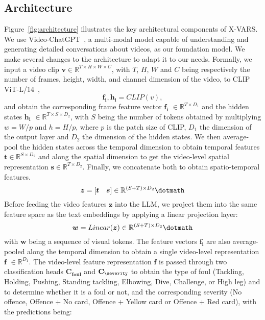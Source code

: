 \subsection{Architecture}

Figure~\ref{fig:architecture} illustrates the key architectural components of X-VARS. We use Video-ChatGPT~\cite{Maaz2023VideoChatGPT-arxiv}, a multi-modal model capable of understanding and generating detailed conversations about videos, as our foundation model. We make several changes to the architecture to adapt it to our needs.
Formally, we input a video clip $\mathbf{v} \in \mathbb{R}^{T\times H \times W \times C}$, with $T$, $H$, $W$ and $C$ being respectively the number of frames, height, width, and channel dimension of the video, to CLIP ViT-L/14~\cite{Radford2021Learning},
\begin{equation}
    \boldsymbol{f_i} , \boldsymbol{h_i} = CLIP(v) \comma
\end{equation}
and obtain the corresponding frame feature vector $\boldsymbol{f_i}$ $\in \mathbb{R}^{T\times D_1}$ and the hidden states $\boldsymbol{h_i}$ $\in \mathbb{R}^{T \times S \times D_2}$, with $S$ being the number of tokens obtained by multiplying $w = W/p$ and $h = H/p$, where $p$ is the patch size of CLIP, $D_1$ the dimension of the output layer and $D_2$ the dimension of the hidden states.
We then average-pool the hidden states across the temporal dimension to obtain temporal features $\textbf{t}\in \mathbb{R}^{S\times D_2}$ and along the spatial dimension to get the video-level spatial representation $\textbf{s}\in \mathbb{R}^{T\times D_2}$.
Finally, we concatenate both to obtain spatio-temporal features.
\begin{equation}
    \boldsymbol{z} = [\boldsymbol{t} \quad \boldsymbol{s}] \in \mathbb{R}^{(S + T) \times D_2} \dotmath
\end{equation}
Before feeding the video features $\boldsymbol{z}$ into the LLM, we project them into the same feature space as the text embeddings by applying a linear projection layer: 
\begin{equation}
    \boldsymbol{w} = Linear(\boldsymbol{z}) \in \mathbb{R}^{(S + T) \times D_2}  \dotmath
\end{equation}
with $\boldsymbol{w}$ being a sequence of visual tokens.
The feature vectors $\boldsymbol{f_i}$ are also average-pooled along the temporal dimension to obtain a single video-level representation $\boldsymbol{f}$ $\in \mathbb{R}^{D_1}$.
The video-level feature representation $\boldsymbol{f}$ is passed through two classification heads  $\mathbf{C_{foul}}$ and  $\mathbf{C_{\severity}}$ to obtain the type of foul (\ie Tackling, Holding, Pushing, Standing tackling, Elbowing, Dive, Challenge, or High leg) and to determine whether it is a foul or not, and the corresponding severity (\ie No offence, Offence + No card, Offence + Yellow card or Offence + Red card), with the predictions being:
